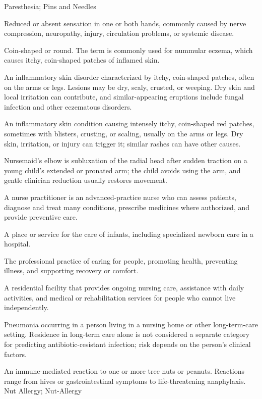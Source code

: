 \synonyms
Paresthesia; Pins and Needles

 Reduced or absent sensation in one or both hands, commonly caused by nerve compression, neuropathy, injury, circulation problems, or systemic disease.

 Coin-shaped or round. The term is commonly used for nummular eczema, which causes itchy, coin-shaped patches of inflamed skin.

 An inflammatory skin disorder characterized by itchy, coin-shaped patches, often on the arms or legs. Lesions may be dry, scaly, crusted, or weeping. Dry skin and local irritation can contribute, and similar-appearing eruptions include fungal infection and other eczematous disorders.

 An inflammatory skin condition causing intensely itchy, coin-shaped red patches, sometimes with blisters, crusting, or scaling, usually on the arms or legs. Dry skin, irritation, or injury can trigger it; similar rashes can have other causes.

 Nursemaid's elbow is subluxation of the radial head after sudden traction on a young child's extended or pronated arm; the child avoids using the arm, and gentle clinician reduction usually restores movement.

 A nurse practitioner is an advanced-practice nurse who can assess patients, diagnose and treat many conditions, prescribe medicines where authorized, and provide preventive care.

 A place or service for the care of infants, including specialized newborn care in a hospital.

 The professional practice of caring for people, promoting health, preventing illness, and supporting recovery or comfort.

 A residential facility that provides ongoing nursing care, assistance with daily activities, and medical or rehabilitation services for
people who cannot live independently.

 Pneumonia occurring in a person living in a nursing home or other long-term-care setting. Residence in long-term care alone is not considered a separate category for predicting antibiotic-resistant infection; risk depends on the person's clinical factors.

 An immune-mediated reaction to one or more tree nuts or peanuts. Reactions range from hives or gastrointestinal symptoms to life-threatening anaphylaxis.
\synonyms
Nut Allergy; Nut-Allergy

